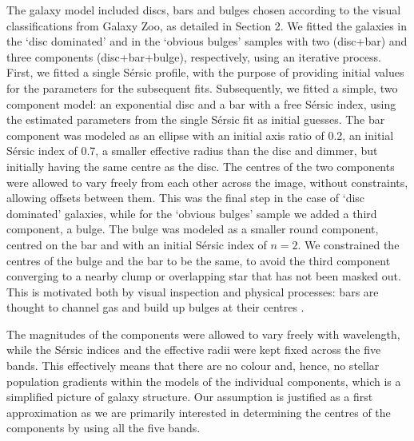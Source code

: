 \documentclass[a4paper,fleqn,usenatbib,useAMS]{mnras}
\begin{document}
The galaxy model included discs, bars and bulges chosen according to the visual classifications from Galaxy Zoo, as detailed in Section 2.  We fitted the galaxies in the `disc dominated' and in the `obvious bulges' samples with two (disc+bar) and three components (disc+bar+bulge), respectively, using an iterative process. First, we fitted a single S\'ersic profile, with the purpose of providing initial values for the parameters for the subsequent fits. Subsequently, we fitted a simple, two component model: an exponential disc and a bar with a free S\'ersic index, using the estimated parameters from the single S\'ersic fit as initial guesses. The bar component was modeled as an ellipse with an initial axis ratio of 0.2, an initial S\'ersic index of 0.7, a smaller effective radius than the disc and dimmer, but initially having the same centre as the disc. The centres of the two components were allowed to vary freely from each other across the image, without constraints, allowing offsets between them. This was the final step in the case of `disc dominated' galaxies, while for the `obvious bulges' sample we added a third component, a bulge. The bulge was modeled as a smaller round component, centred on the bar and with an initial S\'ersic index of $n=2$. We constrained the centres of the bulge and the bar to be the same, to avoid the third component converging to a nearby clump or overlapping star that has not been masked out. This is motivated both by visual inspection and physical processes: bars are thought to channel gas and build up bulges at their centres \citep{Kormendy2004}.

The magnitudes of the components were allowed to vary freely with wavelength, while the S\'ersic indices and the effective radii were kept fixed across the five bands. This effectively means that there are no colour and, hence, no stellar population gradients within the models of the individual components, which is a simplified picture of galaxy structure. Our assumption is justified as a first approximation as we are primarily interested in determining the centres of the components by using all the five bands. 
\end{document}
